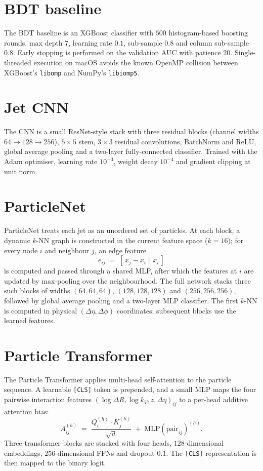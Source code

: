 \documentclass[12pt,a4paper,oneside]{report}
\begin{document}
\section{BDT baseline}
The BDT baseline is an XGBoost classifier with $500$ histogram-based
boosting rounds, max depth $7$, learning rate $0.1$, sub-sample
$0.8$ and column sub-sample $0.8$. Early stopping is performed on
the validation AUC with patience $20$.  Single-threaded execution
on macOS avoids the known OpenMP collision between XGBoost's
\texttt{libomp} and NumPy's \texttt{libiomp5}.

\section{Jet CNN}
The CNN is a small ResNet-style stack with three residual blocks
(channel widths $64\!\to\!128\!\to\!256$), $5\!\times\!5$ stem,
$3\!\times\!3$ residual convolutions, BatchNorm and ReLU, global
average pooling and a two-layer fully-connected classifier.
Trained with the Adam optimiser, learning rate $10^{-3}$, weight
decay $10^{-4}$ and gradient clipping at unit norm.

\section{ParticleNet}
ParticleNet treats each jet as an unordered set of particles.  At
each block, a dynamic $k$-NN graph is constructed in the current
feature space ($k\!=\!16$); for every node $i$ and neighbour $j$, an
edge feature
\[
    e_{ij}\;=\;[\,x_j-x_i\;\Vert\;x_i\,]
\]
is computed and passed through a shared MLP, after which the
features at $i$ are updated by max-pooling over the neighbourhood.
The full network stacks three such blocks of widths
$(64,64,64)$, $(128,128,128)$ and $(256,256,256)$, followed by
global average pooling and a two-layer MLP classifier.  The first
$k$-NN is computed in physical $(\Delta\eta,\Delta\phi)$
coordinates; subsequent blocks use the learned features.

\section{Particle Transformer}
The Particle Transformer applies multi-head self-attention to the
particle sequence.  A learnable \texttt{[CLS]} token is prepended,
and a small MLP maps the four pairwise interaction features
$(\log\Delta R,\log k_T,z,\Delta\eta)_{ij}$ to a per-head additive
attention bias:
\begin{equation}
    A_{ij}^{(h)}\;=\;\frac{Q_i^{(h)}\!\cdot\!K_j^{(h)}}{\sqrt{d}}
                 \;+\;\text{MLP}(\text{pair}_{ij})^{(h)}.
\end{equation}
Three transformer blocks are stacked with four heads,
$128$-dimensional embeddings, $256$-dimensional FFNs and dropout
$0.1$.  The \texttt{[CLS]} representation is then mapped to the
binary logit.
\end{document}
